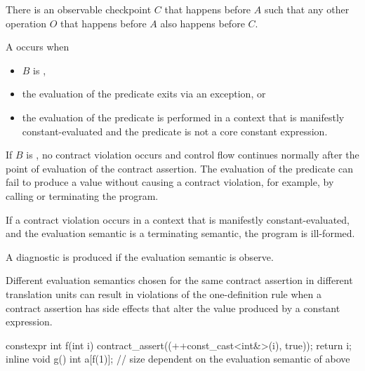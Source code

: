 \pnum
There is an observable checkpoint $C$
that happens before $A$
such that any other operation $O$
that happens before $A$
also happens before $C$.

\pnum
A  occurs when
\begin{itemize}
\item
$B$ is ,
\item
the evaluation of the predicate
exits via an exception, or
\item
the evaluation of the predicate
is performed in a context that is
manifestly constant-evaluated
and the predicate
is not a core constant expression.
\end{itemize}

\begin{note}
If $B$ is ,
no contract violation occurs and
control flow continues normally
after the point of evaluation of the contract assertion.
The evaluation of the predicate
can fail to produce a value
without causing a contract violation,
for example,
by calling 
or terminating the program.
\end{note}

\pnum
{}%
If a contract violation occurs
in a context that is manifestly constant-evaluated,
and the evaluation semantic is
a terminating semantic,
the program is ill-formed.

\begin{note}
A diagnostic is produced
if the evaluation semantic is observe.
\end{note}

\begin{note}
Different evaluation semantics
chosen for the same contract assertion
in different translation units
can result in
violations of the one-definition rule
when a contract assertion has side effects
that alter the value produced by a constant expression.
\begin{example}
\begin{codeblock}
constexpr int f(int i)
{
  contract_assert((++const_cast<int&>(i), true));
  return i;
}
inline void g()
{
  int a[f(1)];  // size dependent on the evaluation semantic of  above
}
\end{codeblock}
\end{example}
\end{note}

